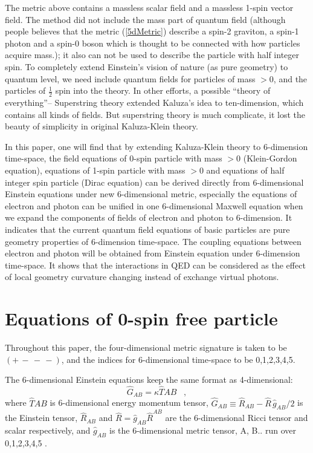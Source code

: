 \documentclass[twocolumn,showpacs,preprintnumbers,amsmath,amssymb]{revtex4}
\begin{document}
The metric above contains a massless scalar field and a massless 1-spin vector field. The method did not
include the mass part of quantum field (although people believes that the metric (\ref{5dMetric}) describe 
a spin-2 graviton, 
a spin-1 photon and a spin-0 boson which is thought to be connected with how particles acquire mass.);
it also can not be used to describe the particle with half integer spin. To completely extend Einstein's vision
of nature (as pure geometry) to quantum level, we need include quantum fields for particles of
 mass $>0$, and the particles of $\frac{1}{2}$ spin into the theory. In other efforts, a possible 
``theory of everything''-- Superstring theory extended Kaluza's idea to ten-dimension,  
 which contains all kinds of fields. But superstring theory is much complicate, it lost the beauty of 
 simplicity in original Kaluza-Klein theory. 
 
In this paper, one will find that by extending Kaluza-Klein theory to 6-dimension time-space, 
the field equations of 0-spin particle with mass $>0$ (Klein-Gordon equation), equations of 1-spin particle with 
mass $>0$ and equations of half integer spin particle (Dirac equation) can be derived directly from 6-dimensional 
Einstein equations under new 6-dimensional metric, especially the equations of electron and photon can be unified 
in one 6-dimensional Maxwell equation when we expand the components of fields of electron and photon 
to 6-dimension. 
It indicates that the current quantum field
equations of basic particles are pure geometry properties of 6-dimension time-space. 
The coupling equations between electron and photon will be obtained from Einstein equation under 6-dimension 
time-space. It shows that the interactions in QED can be considered as
the effect of local geometry curvature changing instead of exchange virtual photons. 


\section{Equations of 0-spin free particle} \label{ZeroSpin}

Throughout this paper, the four-dimensional metric signature is taken to be $(+ \, - \, - \, -)$, 
and the indices for 6-dimensional time-space to be 0,1,2,3,4,5. 

The 6-dimensional Einstein equations keep the same format as 4-dimensional:
\begin{equation}
\hat{G}_{AB} = \kappa \hat{T}{AB} \; \; \; ,
\label{5dEFE1}
\end{equation}
where $\hat{T}{AB}$ is 6-dimensional energy momentum tensor, 
$\hat{G}_{AB} \equiv \hat{R}_{AB} - \hat{R} \, \hat{g}_{AB} / 2$
is the Einstein tensor, $\hat{R}_{AB}$ and
$\hat{R} = \hat{g}_{AB} \hat{R}^{AB}$ are 
the 6-dimensional Ricci tensor and scalar respectively,
and $\hat{g}_{AB}$ is the 6-dimensional metric tensor, A, B.. run over 0,1,2,3,4,5 .
\end{document}
